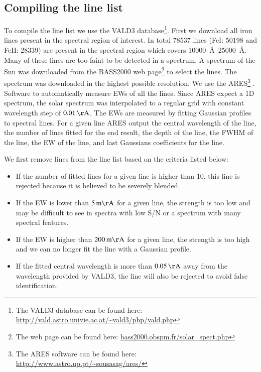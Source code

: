 \documentclass{aa}
\begin{document}
\subsection{Compiling the line list}

To compile the line list we use the VALD3
database\footnote{The VALD3 database can be found here:
\url{http://vald.astro.univie.ac.at/~vald3/php/vald.php}}.
First we download all iron lines present in the spectral
region of interest. In total 78537 lines (FeI: 50198 and
FeII: 28339) are present in the spectral region which covers
\SIrange{10000}{25000}{\angstrom}. Many of these lines are too faint
to be detected in a spectrum. A spectrum of the Sun was downloaded
from the BASS2000 web page\footnote{The web page can be found here:
\url{bass2000.obspm.fr/solar_spect.php}} to select the lines.
The spectrum was downloaded in the highest possible resolution.
We use the ARES\footnote{The ARES software can be found here:
\url{http://www.astro.up.pt/~sousasag/ares/}}\citep{Sousa2007,Sousa2015}
. Software to automatically measure EWs of all the lines. Since ARES
expect a 1D spectrum, the solar spectrum was interpolated to a regular
grid with constant wavelength step of $\SI{0.01}{\AA}$. The EWs are
measured by fitting Gaussian profiles to spectral lines. For a given
line ARES output the central wavelength of the line, the number of lines
fitted for the end result, the depth of the line, the FWHM of the line,
the EW of the line, and last Gaussians coefficients for the line.

We first remove lines from the line list based on the criteria listed
below:
\begin{itemize}
    \item If the number of fitted lines for a given line is higher than 10,
        this line is rejected because it is believed to be severely blended.
    \item If the EW is lower than $\SI{5}{m\AA}$ for a given line, the strength
        is too low and may be difficult to see in spectra with low S/N or a
        spectrum with many spectral features.
    \item If the EW is higher than $\SI{200}{m\AA}$ for a given line, the strength
        is too high and we can no longer fit the line with a Gaussian profile.
    \item If the fitted central wavelength is more than $\SI{0.05}{\AA}$ away
        from the wavelength provided by VALD3, the line will also be rejected to
        avoid false identification.
\end{itemize}
\end{document}
